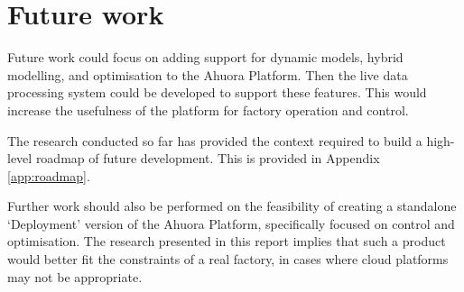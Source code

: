 

\section{Future work}
Future work could focus on adding support for dynamic models, hybrid modelling, and optimisation to the Ahuora Platform. Then the live data processing system could be developed to support these features. 
This would increase the usefulness of the platform for factory operation and control. 


The research conducted so far has provided the context required to build a high-level roadmap of future development. This is provided in Appendix \ref{app:roadmap}.



Further work should also be performed on the feasibility of creating a standalone `Deployment' version of the Ahuora Platform, specifically focused on control and optimisation. The research presented in this report implies that such a product would better fit the constraints of a real factory, in cases where cloud platforms may not be appropriate.





